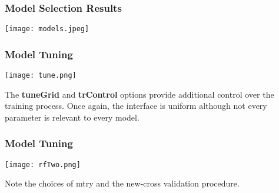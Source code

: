 \documentclass[presentation]{beamer}
\begin{document}

\begin{frame}
\frametitle{Model Selection Results}

\begin{center}
\texttt{[image: models.jpeg]}
\end{center}

\end{frame}


\begin{frame}
\frametitle{Model Tuning}

\begin{center}
\texttt{[image: tune.png]}
\end{center}

The \textbf{tuneGrid} and \textbf{trControl} options provide additional control over the training process.  Once again, the interface is uniform although not every parameter is relevant to every model.

\end{frame}


\begin{frame}
\frametitle{Model Tuning}

\begin{center}
\texttt{[image: rfTwo.png]}
\end{center}

Note the choices of mtry and the new-cross validation procedure.

\end{frame}

\end{document}
